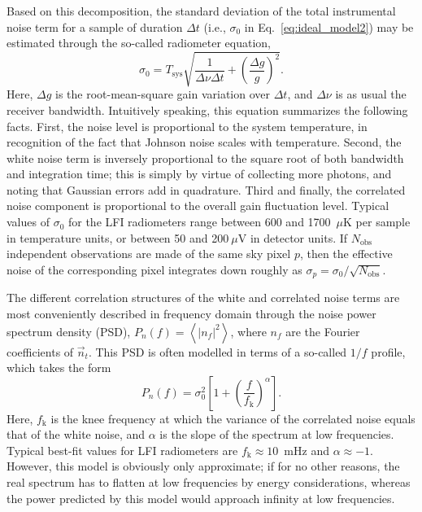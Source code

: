 \documentclass[twocolumn]{aa}
\newcommand{\n}[0]{\vec{n}}
\begin{document}
Based on this decomposition, the standard deviation of the total
instrumental noise term for a sample of duration $\Delta t$ (i.e.,
$\sigma_0$ in Eq.~\eqref{eq:ideal_model2}) may be estimated through
the so-called radiometer equation,
\begin{equation}
\sigma_0 = T_{\mathrm{sys}} \sqrt{\frac{1}{\Delta\nu \Delta t} +
  \left(\frac{\Delta g}{g}\right)^2}.
\end{equation}
Here, $\Delta g$ is the root-mean-square gain variation over $\Delta
t$, and $\Delta \nu$ is as usual the receiver bandwidth. Intuitively
speaking, this equation summarizes the following facts. First, the
noise level is proportional to the system temperature, in recognition
of the fact that Johnson noise scales with temperature. Second, the
white noise term is inversely proportional to the square root of both
bandwidth and integration time; this is simply by virtue of collecting
more photons, and noting that Gaussian errors add in quadrature. Third
and finally, the correlated noise component is proportional to the
overall gain fluctuation level. Typical values of $\sigma_0$ for the
LFI radiometers range between 600 and 1700~$\mu\mathrm{K}$ per sample
in temperature units, or between 50 and 200$~\mu\mathrm{V}$ in
detector units. If $N_{\mathrm{obs}}$ independent observations are
made of the same sky pixel $p$, then the effective noise of the
corresponding pixel integrates down roughly as $\sigma_p = \sigma_0 /
\sqrt{N_{\mathrm{obs}}}$.

The different correlation structures of the white and correlated noise
terms are most conveniently described in frequency domain through the
noise power spectrum density (PSD), $P_n(f) = \left<|n_f|^2\right>$,
where $n_f$ are the Fourier coefficients of $\n_t$. This PSD is often
modelled in terms of a so-called $1/f$ profile, which takes the form
\begin{equation}
  P_n(f) = \sigma_0^2 \left[1 +
    \left(\frac{f}{f_{\mathrm{k}}}\right)^{\alpha} \right].
  \label{eq:n_psd}
\end{equation}
Here, $f_\mathrm{k}$ is the knee frequency at which the variance of
the correlated noise equals that of the white noise, and $\alpha$ is
the slope of the spectrum at low frequencies. Typical best-fit values
for LFI radiometers are $f_{\mathrm{k}}\approx10$~mHz and
$\alpha\approx-1$. However, this model is obviously only approximate;
if for no other reasons, the real spectrum has to flatten at low
frequencies by energy considerations, whereas the power predicted by
this model would approach infinity at low frequencies.
\end{document}
